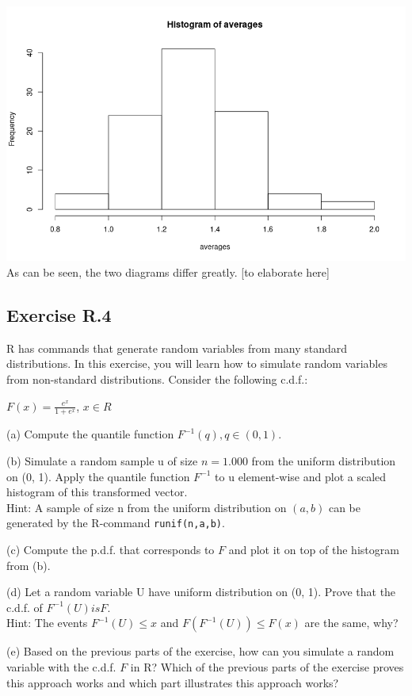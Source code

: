 \documentclass[12pt]{article}
\begin{document}
\includegraphics[width=\textwidth]{Ex3Plot3}
As can be seen, the two diagrams differ greatly. [to elaborate here]

\subsection*{Exercise R.4}
R has commands that generate random variables from many standard distributions. In this exercise, you will learn how to simulate random variables from non-standard distributions. Consider the following c.d.f.:

$F(x) = \frac{e^{x}}{1 + e^{x}}$, $x \in R$

(a) Compute the quantile function $F^{-1}(q), q \in (0, 1)$.

(b) Simulate a random sample u of size $n = 1.000$ from the uniform distribution on (0, 1). Apply the quantile function $F^{-1}$ to u element-wise and plot a scaled histogram of this transformed vector.\\
Hint: A sample of size n from the uniform distribution on $(a, b)$ can be generated by the R-command \texttt{runif(n,a,b)}.

(c) Compute the p.d.f. that corresponds to $F$ and plot it on top of the histogram from (b).

(d) Let a random variable U have uniform distribution on (0, 1). Prove that the c.d.f. of $F^{-1}(U) is F$.\\
Hint: The events ${F^{-1}(U) \leq x}$ and ${F(F^{-1}(U)) \leq F(x)}$ are the same, why?

(e) Based on the previous parts of the exercise, how can you simulate a random variable with the c.d.f. $F$ in R? Which of the previous parts of the exercise proves this approach works and which part illustrates this approach works?
\end{document}
